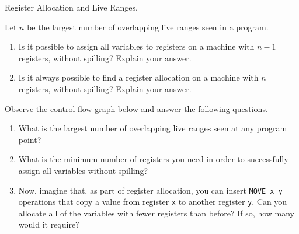 \begin{problem}
    Register Allocation and Live Ranges.

    \begin{problempart}
        Let $n$ be the largest number of overlapping live ranges seen in a program.
        \begin{enumerate}
            \item Is it possible to assign all variables to registers on a machine with $n - 1$ registers, without spilling? Explain your answer.
            \item Is it always possible to find a register allocation on a machine with $n$ registers, without spilling? Explain your answer.
        \end{enumerate}
    \end{problempart}
    \begin{problempart}
        Observe the control-flow graph below and answer the following questions.
        \begin{enumerate}
            \item What is the largest number of overlapping live ranges seen at any program point?
            \item What is the minimum number of registers you need in order to successfully assign all variables without spilling?
            \item Now, imagine that, as part of register allocation, you can insert \texttt{MOVE x y} operations that copy a value from register \texttt{x} to another register \texttt{y}. Can you allocate all of the variables with fewer registers than before? If so, how many would it require?
        \end{enumerate}
    \end{problempart}

    \begin{center}
    \end{center}

    \newpage
\end{problem}
